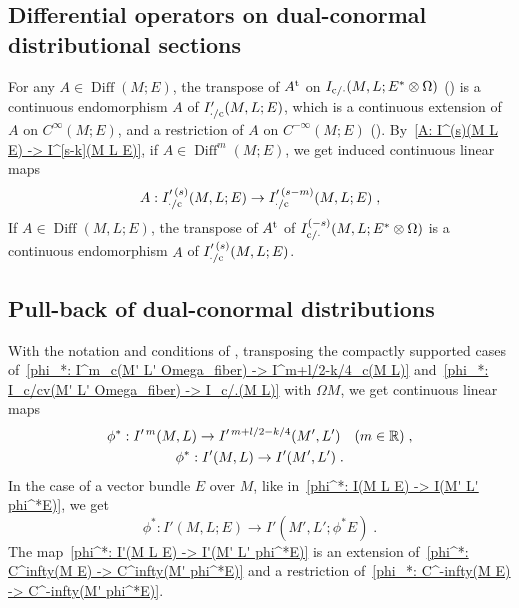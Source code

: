 \documentclass{memo-l}
\theoremstyle{plain}
\theoremstyle{definition}
\theoremstyle{remark}
\newcommand{\R}{\mathbb{R}}
\newcommand{\Diff}{\operatorname{Diff}}
\newcommand{\co}{{\text{\rm c}}}
\newcommand{\trans}{{\text{\rm t}}}
\numberwithin{section}{chapter}
\numberwithin{equation}{section}%
\begin{document}
\subsection{Differential operators on dual-conormal distributional sections}
\label{ss: diff opers on dual-conormal distribs}

For any $A\in\Diff(M;E)$, the transpose of $A^\trans$ on $I_{\co/{\cdot}}(M,L;E^*\otimes\Omega)$ () is a continuous endomorphism $A$ of $I'_{{\cdot}/\co}(M,L;E)$, which is a continuous extension of $A$ on $C^\infty(M;E)$, and a restriction of $A$ on $C^{-\infty}(M;E)$ (). By~\eqref{A: I^(s)(M L E) -> I^[s-k](M L E)}, if $A\in\Diff^m(M;E)$, we get induced continuous linear maps
\begin{equation}\label{A: I^prime [s](M L E) -> I^prime (s-m)(M L E)}
A:I^{\prime\,(s)}_{{\cdot}/\co}(M,L;E)\to I^{\prime\,(s-m)}_{{\cdot}/\co}(M,L;E)\;,
\end{equation}
If $A\in\Diff(M,L;E)$, the transpose of $A^\trans$ of $I^{(-s)}_{\co/{\cdot}}(M,L;E^*\otimes\Omega)$ is a continuous endomorphism $A$ of $I^{\prime\,(s)}_{{\cdot}/\co}(M,L;E)$.



\subsection{Pull-back of dual-conormal distributions}
\label{ss: pull-back of dual-conormal distributions}

With the notation and conditions of , transposing the compactly supported cases  of~\eqref{phi_*: I^m_c(M' L' Omega_fiber) -> I^m+l/2-k/4_c(M L)} and~\eqref{phi_*: I_c/cv(M' L' Omega_fiber) -> I_c/.(M L)} with $\Omega M$, we get continuous linear maps 
\begin{gather}
\phi^*:I^{\prime\,m}(M,L)\to I^{\prime\,m+l/2-k/4}(M',L')\quad(m\in\R)\;,\notag\\
\phi^*:I'(M,L)\to I'(M',L')\;.\label{phi^*: I'(M L) -> I'(M' L')}
\end{gather}
 In the case of a vector bundle $E$ over $M$, like in~\eqref{phi^*: I(M L E) -> I(M' L' phi^*E)}, we get
\begin{equation}\label{phi^*: I'(M L E) -> I'(M' L' phi^*E)}
\phi^*:I'(M,L;E)\to I'(M',L';\phi^*E)\;.
\end{equation}
The map~\eqref{phi^*: I'(M L E) -> I'(M' L' phi^*E)} is an extension of~\eqref{phi^*: C^infty(M E) -> C^infty(M' phi^*E)} and a restriction of~\eqref{phi_*: C^-infty(M E) -> C^-infty(M' phi^*E)}.
\end{document}
